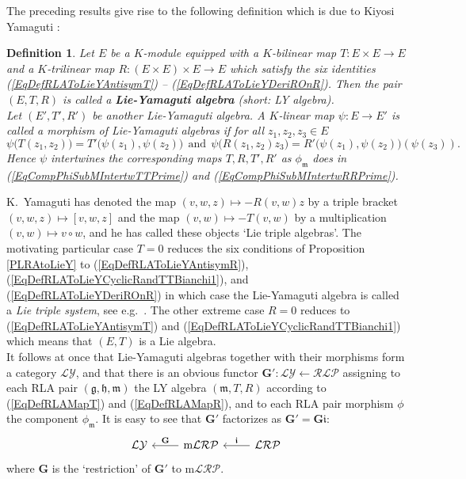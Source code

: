 \documentclass [11pt] {article}
\newtheorem {definition}[lemma] {Definition}
\theoremstyle{definition}
\begin{document}
\noindent 
The preceding results give rise to the following definition which is due to Kiyosi Yamaguti 
\cite[p.~157, Def.~2.1]{Yam58}:
\begin{definition}
	Let $E$ be a $K$-module equipped with a $K$-bilinear map $T:E\times E\to E$ and a $K$-trilinear map
	$R:(E\times E)\times E\to E$ which satisfy the six identities (\ref{EqDefRLAToLieYAntisymT}) --
	(\ref{EqDefRLAToLieYDeriROnR}). Then the pair
	$(E,T,R)$ is called a \textbf{Lie-Yamaguti algebra}
	(short: LY algebra).\\
	Let $(E',T',R')$ be another Lie-Yamaguti algebra.
	A $K$-linear map $\psi:E\to E'$  is called
	a morphism of Lie-Yamaguti algebras if for all
	$z_1,z_2,z_3\in E$
	\begin{equation}\label{EqDefMorphLY} 
	 \psi\big(T(z_1,z_2)\big)
	 =  T'\big(\psi(z_1),
	\psi(z_2)\big)~~\mathrm{and}~~
	\psi\big(R(z_1,z_2)z_3\big)
	 =  R'\big(\psi(z_1),
	\psi(z_2)\big)(\psi(z_3)).
	\end{equation}
	Hence $\psi$ intertwines the corresponding maps $T,R,T',R'$ as $\phi_\mathfrak{m}$ does in 
	(\ref{EqCompPhiSubMIntertwTTPrime})
	and (\ref{EqCompPhiSubMIntertwRRPrime}).
\end{definition}
\noindent K.~Yamaguti has denoted the map $(v,w,z)\mapsto -R(v,w)z$ by a triple bracket
$(v,w,z)\mapsto[v,w,z]$ and the map $(v,w)\mapsto -T(v,w)$ by a multiplication
$(v,w)\mapsto v\circ w$, and he has called these objects `Lie triple algebras'. The motivating  particular case $T=0$ reduces the six conditions of Proposition \ref{PLRAtoLieY} to
(\ref{EqDefRLAToLieYAntisymR}), (\ref{EqDefRLAToLieYCyclicRandTTBianchi1}), and
(\ref{EqDefRLAToLieYDeriROnR}) in which case the Lie-Yamaguti algebra is called a \textit{Lie triple system}, see e.g.~\cite{Jac49}. The other extreme case $R=0$
reduces to (\ref{EqDefRLAToLieYAntisymT}) and (\ref{EqDefRLAToLieYCyclicRandTTBianchi1}) which means that $(E,T)$ is a Lie algebra.\\
It follows at once that Lie-Yamaguti algebras together with their
morphisms form a category $\mathcal{LY}$, and that there
is an obvious functor $\mathbf{G}': \mathcal{LY} \longleftarrow  \mathcal{RLP}$
assigning to each RLA pair $(\mathfrak{g},\mathfrak{h},\mathfrak{m})$ the LY algebra
$(\mathfrak{m},T,R)$ according to
(\ref{EqDefRLAMapT}) and (\ref{EqDefRLAMapR}), and to
each RLA pair morphism $\phi$ the component $\phi_\mathfrak{m}$. It is easy to see
that $\mathbf{G}'$ factorizes as $\mathbf{G}'=\mathbf{G}\boldsymbol{\mathfrak{i}}$:
\begin{equation}\label{EqDefFunctorG}
    \begin{tikzcd}
    	\mathcal{LY} &
    	    \mathrm{m}\mathcal{LRP}
    	      \arrow[l, "\mathbf{G}"'] &
    	        \mathcal{LRP}
    	        \arrow[l, "\boldsymbol{\mathfrak{i}}"']
    \end{tikzcd}
\end{equation}
where $\mathbf{G}$ is the `restriction' of $\mathbf{G}'$ to $\mathrm{m}\mathcal{LRP}$.
\end{document}
